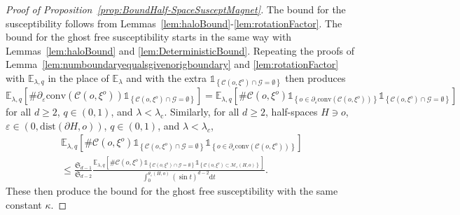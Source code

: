 \documentclass[10pt,a4paper,dvipsnames]{article}
\theoremstyle{definition}
\theoremstyle{remark}
\newcommand{\ela}{\mathbb E_{\lambda}}
\newcommand{\elaq}{\mathbb E_{\lambda,q}}
\newcommand{\Mcal}{\mathcal{M}}
\newcommand{\dd}{\mathrm{d}} %
\newcommand{\C}{\mathscr {C}}
\newcommand{\convex}[1]{{\mathrm{conv}\left(#1\right)}}
\newcommand{\Gcal}{\mathcal{G}}
\newcommand{\Id}{\mathds 1}
\newcommand{\dist}[1]{\mathrm{dist}\left(#1\right)}
\newcommand{\orig}{o}
\numberwithin{equation}{section}
\begin{document}
\begin{proof}[Proof of Proposition~\ref{prop:BoundHalf-SpaceSusceptMagnet}]
    The bound for the susceptibility follows from Lemmas~\ref{lem:haloBound}-\ref{lem:rotationFactor}. The bound for the ghost free susceptibility starts in the same way with Lemmas~\ref{lem:haloBound} and \ref{lem:DeterministicBound}. Repeating the proofs of Lemma~\ref{lem:numboundaryequalsgivenorigboundary} and \ref{lem:rotationFactor} with $\elaq$ in the place of $\ela$ and with the extra $\Id_{\left\{\C\left(\orig,\xi^\orig\right)\cap\Gcal=\emptyset\right\}}$ then produces
    \begin{equation}
        \elaq\left[\#\partial_\varepsilon\convex{\C\left(\orig,\xi^{\orig}\right)}\Id_{\left\{\C\left(\orig,\xi^\orig\right)\cap\Gcal=\emptyset\right\}}\right] = \elaq\left[\#\C\left(\orig,\xi^{\orig}\right)\Id_{\left\{\orig\in\partial_\varepsilon\convex{\C\left(\orig,\xi^{\orig}\right)}\right\}}\Id_{\left\{\C\left(\orig,\xi^\orig\right)\cap\Gcal=\emptyset\right\}}\right]
    \end{equation}
    for all $d\geq 2$, $q\in\left(0,1\right)$, and $\lambda<\lambda_\mathrm{c}$. Similarly, for all $d\geq 2$, half-spaces $H\ni\orig$, $\varepsilon\in\left(0,\dist{\partial H,\orig}\right)$, $q\in\left(0,1\right)$, and $\lambda<\lambda_c$,
    \begin{multline}
        \elaq\left[\#\C\left(\orig,\xi^{\orig}\right)\Id_{\left\{\C\left(\orig,\xi^\orig\right)\cap\Gcal=\emptyset\right\}}\Id_{\left\{\orig\in\partial_\varepsilon\convex{\C\left(\orig,\xi^{\orig}\right)}\right\}}\right] \\
        \leq \frac{\mathfrak{S}_{d-1}}{\mathfrak{S}_{d-2}}\frac{\elaq\left[\#\C\left(\orig,\xi^{\orig}\right) \Id_{\left\{\C\left(\orig,\xi^\orig\right)\cap\Gcal=\emptyset\right\}}\Id_{\left\{\C\left(\orig,\xi^{\orig}\right)\subset\Mcal_\varepsilon\left( H,\orig\right)\right\}}\right]}{\int^{\theta_\varepsilon\left(H,\orig\right)}_0\left(\sin t\right)^{d-2}\dd t}.
    \end{multline}
    These then produce the bound for the ghost free susceptibility with the same constant $\kappa$.


\end{proof}
\end{document}
